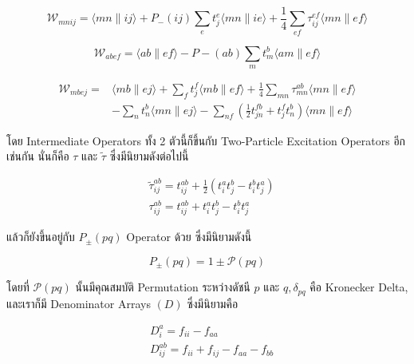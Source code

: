 \begin{equation}
  \label{eq:W_mnij}
  \mathscr{W}_{m n i j}
  = \langle m n \| i j\rangle+P_{-}(i j) \sum_e t_j^e\langle m n \| i e\rangle
  + \frac{1}{4} \sum_{e f} \tau_{i j}^{e f}\langle m n \| e f\rangle
\end{equation}

\begin{equation}
  \label{eq:W_abef}
  \mathscr{W}_{a b e f}=\langle a b \| e f\rangle-P-(a b) \sum_m t_m^b\langle a m \| e f\rangle
\end{equation}

\begin{equation}
  \label{eq:W_mbej}
  \begin{aligned}
    \mathscr{W}_{m b e j}
    =
     & \langle m b \| e j\rangle+\sum_f t_j^f\langle m b \| e f\rangle
    + \frac{1}{4} \sum_{m n} \tau_{m n}^{a b}\langle m n \| e f\rangle \\
     & - \sum_n t_n^b\langle m n \| e j\rangle
    - \sum_{n f}\left(\frac{1}{2} t_{j n}^{f b}+t_j^f t_n^b\right)\langle m n \| e f\rangle
  \end{aligned}
\end{equation}

\noindent โดย Intermediate Operators ทั้ง 2 ตัวนี้ก็ขึ้นกับ Two-Particle Excitation Operators อีกเช่นกัน นั่นก็คือ $\tau$
และ $\tilde{\tau}$ ซึ่งมีนิยามดังต่อไปนี้

\begin{align}
  \label{eq:tau_abij_tilde}
   & \tilde{\tau}_{i j}^{a b}
  =
  t_{i j}^{a b}+\frac{1}{2}\left(t_i^a t_j^b-t_i^b t_j^a\right) \\
  \label{eq:tau_abij}
   & \tau_{i j}^{a b}
  =
  t_{i j}^{a b}+t_i^a t_j^b-t_i^b t_j^a
\end{align}

\noindent แล้วก็ยังขึ้นอยู่กับ $P_{ \pm}(p q)$ Operator ด้วย ซึ่งมีนิยามดังนี้

\begin{equation}
  P_{ \pm}(p q)
  =
  1 \pm \mathscr{P}(p q)
\end{equation}

\noindent โดยที่ $\mathscr{P}(p q)$ นั้นมีคุณสมบัติ Permutation ระหว่างดัชนี $p$ และ $q, \delta_{p q}$ คือ Kronecker
Delta, และเราก็มี Denominator Arrays $(D)$ ซึ่งมีนิยามคือ

\begin{align}
  \label{eq:D_ai}
   & D_i^a
  =
  f_{i i}-f_{a a}  \\
  \label{eq:D_abij}
   & D_{i j}^{a b}
  =
  f_{i i}+f_{i j}-f_{a a}-f_{b b}
\end{align}

